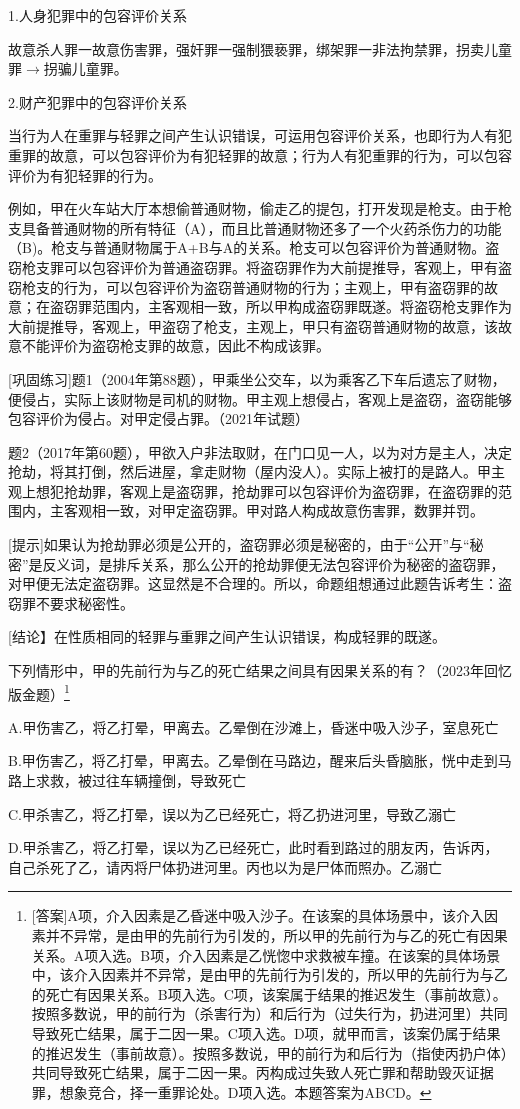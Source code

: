 1.人身犯罪中的包容评价关系

故意杀人罪一故意伤害罪，强奸罪一强制猥亵罪，绑架罪一非法拘禁罪，拐卖儿童罪\ensuremath{\rightarrow}拐骗儿童罪。

2.财产犯罪中的包容评价关系


当行为人在重罪与轻罪之间产生认识错误，可运用包容评价关系，也即行为人有犯重罪的故意，可以包容评价为有犯轻罪的故意；行为人有犯重罪的行为，可以包容评价为有犯轻罪的行为。

例如，甲在火车站大厅本想偷普通财物，偷走乙的提包，打开发现是枪支。由于枪支具备普通财物的所有特征（A），而且比普通财物还多了一个火药杀伤力的功能（B)。枪支与普通财物属于A+B与A的关系。枪支可以包容评价为普通财物。盗窃枪支罪可以包容评价为普通盗窃罪。将盗窃罪作为大前提推导，客观上，甲有盗窃枪支的行为，可以包容评价为盗窃普通财物的行为；主观上，甲有盗窃罪的故意；在盗窃罪范围内，主客观相一致，所以甲构成盗窃罪既遂。将盗窃枪支罪作为大前提推导，客观上，甲盗窃了枪支，主观上，甲只有盗窃普通财物的故意，该故意不能评价为盗窃枪支罪的故意，因此不构成该罪。

[巩固练习]题1（2004年第88题），甲乘坐公交车，以为乘客乙下车后遗忘了财物，便侵占，实际上该财物是司机的财物。甲主观上想侵占，客观上是盗窃，盗窃能够包容评价为侵占。对甲定侵占罪。（2021年试题）

题2（2017年第60题），甲欲入户非法取财，在门口见一人，以为对方是主人，决定抢劫，将其打倒，然后进屋，拿走财物（屋内没人）。实际上被打的是路人。甲主观上想犯抢劫罪，客观上是盗窃罪，抢劫罪可以包容评价为盗窃罪，在盗窃罪的范围内，主客观相一致，对甲定盗窃罪。甲对路人构成故意伤害罪，数罪并罚。

[提示]如果认为抢劫罪必须是公开的，盗窃罪必须是秘密的，由于“公开”与“秘密”是反义词，是排斥关系，那么公开的抢劫罪便无法包容评价为秘密的盗窃罪，对甲便无法定盗窃罪。这显然是不合理的。所以，命题组想通过此题告诉考生：盗窃罪不要求秘密性。

[结论】在性质相同的轻罪与重罪之间产生认识错误，构成轻罪的既遂。


下列情形中，甲的先前行为与乙的死亡结果之间具有因果关系的有？（2023年回忆版金题）\footnote{[答案]A项，介入因素是乙昏迷中吸入沙子。在该案的具体场景中，该介入因素并不异常，是由甲的先前行为引发的，所以甲的先前行为与乙的死亡有因果关系。A项入选。B项，介入因素是乙恍惚中求救被车撞。在该案的具体场景中，该介入因素并不异常，是由甲的先前行为引发的，所以甲的先前行为与乙的死亡有因果关系。B项入选。C项，该案属于结果的推迟发生（事前故意）。按照多数说，甲的前行为（杀害行为）和后行为（过失行为，扔进河里）共同导致死亡结果，属于二因一果。C项入选。D项，就甲而言，该案仍属于结果的推迟发生（事前故意）。按照多数说，甲的前行为和后行为（指使丙扔户体）共同导致死亡结果，属于二因一果。丙构成过失致人死亡罪和帮助毁灭证据罪，想象竞合，择一重罪论处。D项入选。本题答案为ABCD。}

A.甲伤害乙，将乙打晕，甲离去。乙晕倒在沙滩上，昏迷中吸入沙子，室息死亡

B.甲伤害乙，将乙打晕，甲离去。乙晕倒在马路边，醒来后头昏脑胀，恍中走到马路上求救，被过往车辆撞倒，导致死亡

C.甲杀害乙，将乙打晕，误以为乙已经死亡，将乙扔进河里，导致乙溺亡

D.甲杀害乙，将乙打晕，误以为乙已经死亡，此时看到路过的朋友丙，告诉丙，自己杀死了乙，请丙将尸体扔进河里。丙也以为是尸体而照办。乙溺亡

